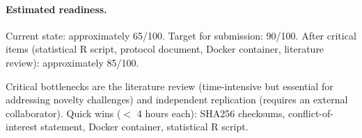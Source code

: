 \paragraph{Estimated readiness.}
Current state: approximately 65/100. Target for submission: 90/100. After
critical items (statistical R script, protocol document, Docker container,
literature review): approximately 85/100.

Critical bottlenecks are the literature review (time-intensive but essential
for addressing novelty challenges) and independent replication (requires an
external collaborator). Quick wins ($<$ 4 hours each): SHA256 checksums,
conflict-of-interest statement, Docker container, statistical R script.
